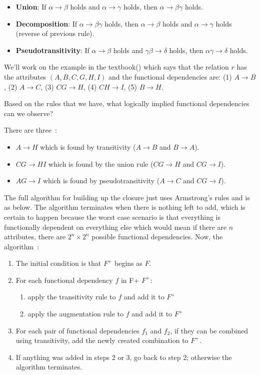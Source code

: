 \begin{itemize}
	\item \textbf{Union}: If $\alpha \rightarrow \beta$ holds and $\alpha \rightarrow \gamma$ holds, then $\alpha \rightarrow \beta\gamma$ holds.
	\item \textbf{Decomposition}: If $\alpha \rightarrow \beta\gamma$ holds, then  $\alpha \rightarrow \beta$ holds and $\alpha \rightarrow \gamma$ holds (reverse of previous rule).
	\item \textbf{Pseudotransitivity}: If $\alpha \rightarrow \beta$ holds and $\gamma\beta \rightarrow \delta$ holds, then $\alpha\gamma \rightarrow \delta$ holds.
\end{itemize}

We'll work on the example in the textbook(\cite{dsc}) which says that the relation $r$ has the attributes $(A, B, C, G, H, I)$ and the functional dependencies are: (1) $A \rightarrow B$, (2) $A \rightarrow C$, (3) $CG \rightarrow H$, (4) $CH \rightarrow I$, (5) $B \rightarrow H$.

Based on the rules that we have, what logically implied functional dependencies can we observe? 

There are three~\cite{dsc}:
\begin{itemize}
	\item $A \rightarrow H$ which is found by transitivity ($A \rightarrow B$ and $B \rightarrow A$).
	\item $CG \rightarrow HI$ which is found by the union rule ($CG \rightarrow H$ and $CG \rightarrow I$).
	\item $AG \rightarrow I$ which is found by pseudotransitivity ($A \rightarrow C$ and $CG \rightarrow I$). 
\end{itemize}

The full algorithm for building up the closure just uses Armstrong's rules and is as below. The algorithm terminates when there is nothing left to add, which is certain to happen because the worst case scenario is that everything is functionally dependent on everything else which would mean if there are $n$ attributes, there are $2^{n} \times 2^{n}$ possible functional dependencies. Now, the algorithm~\cite{dsc}:

\begin{enumerate}
	\item The initial condition is that $F^{+}$ begins as $F$.
	\item For each functional dependency $f$ in F+ $F^{+}$:
	\begin{enumerate}
		\item apply the transitivity rule to $f$ and add it to $F^{+}$
		\item apply the augmentation rule to $f$ and add it to $F^{+}$
	\end{enumerate}
	\item For each pair of functional dependencies $f_{1}$ and $f_{2}$, if they can be combined using transitivity, add the newly created combination to $F^{+}$.
	\item If anything was added in steps 2 or 3, go back to step 2; otherwise the algorithm terminates.
\end{enumerate}





